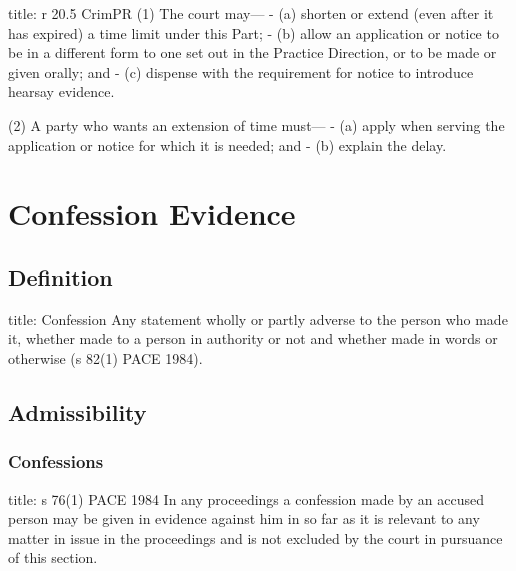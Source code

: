 \documentclass[
]{article}
\newenvironment{Shaded}{}{}
\newcommand{\NormalTok}[1]{#1}
\begin{document}
\begin{Shaded}
\begin{Highlighting}[]
\NormalTok{title: r 20.5 CrimPR}
\NormalTok{(1) The court may—}
\NormalTok{{-} (a) shorten or extend (even after it has expired) a time limit under this Part;}
\NormalTok{{-} (b) allow an application or notice to be in a different form to one set out in the Practice Direction, or to be made or given orally; and}
\NormalTok{{-} (c) dispense with the requirement for notice to introduce hearsay evidence.}

\NormalTok{(2) A party who wants an extension of time must—}
\NormalTok{{-} (a) apply when serving the application or notice for which it is needed; and}
\NormalTok{{-} (b) explain the delay.}
\end{Highlighting}
\end{Shaded}

\hypertarget{confession-evidence}{%
\section{Confession Evidence}\label{confession-evidence}}

\hypertarget{definition}{%
\subsection{Definition}\label{definition}}

\begin{Shaded}
\begin{Highlighting}[]
\NormalTok{title: Confession}
\NormalTok{Any statement wholly or partly adverse to the person who made it, whether made to a person in authority or not and whether made in words or otherwise (s 82(1) PACE 1984).}
\end{Highlighting}
\end{Shaded}

\hypertarget{admissibility-1}{%
\subsection{Admissibility}\label{admissibility-1}}

\hypertarget{confessions}{%
\subsubsection{Confessions}\label{confessions}}

\begin{Shaded}
\begin{Highlighting}[]
\NormalTok{title: s 76(1) PACE 1984}
\NormalTok{In any proceedings a confession made by an accused person may be given in evidence against him in so far as it is relevant to any matter in issue in the proceedings and is not excluded by the court in pursuance of this section.}
\end{Highlighting}
\end{Shaded}
\end{document}

